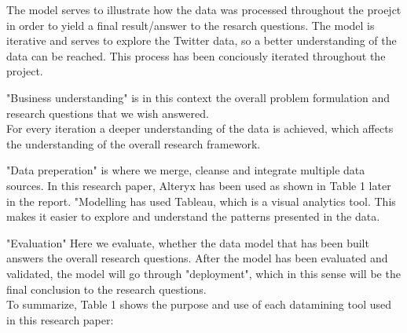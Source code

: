 \documentclass{article}
\begin{document}
The model serves to illustrate how the data was processed throughout the proejct in order to yield a final result/answer to the resarch questions. The model is iterative and serves to explore the Twitter data, so a better
understanding of the data can be reached. This process has been conciously iterated throughout the project.

"Business understanding" is in this context the overall problem formulation and research questions that we wish answered.\\
For every iteration a deeper understanding of the data is achieved, which affects the understanding of the overall research framework.

"Data preperation" is where we merge, cleanse and integrate multiple data sources. In this research paper, Alteryx has been used as shown in Table 1 later in the report.
"Modelling has used Tableau, which is a visual analytics tool. This makes it easier to explore and understand the patterns presented in the data.

"Evaluation" Here we evaluate, whether the data model that has been built answers the overall research questions. After the model has been evaluated and validated, the model will go through "deployment", which in this sense will be the final conclusion to
the research questions.\\

















 To summarize, Table 1 shows the purpose and use of each datamining tool used in this research paper: 
\end{document}
